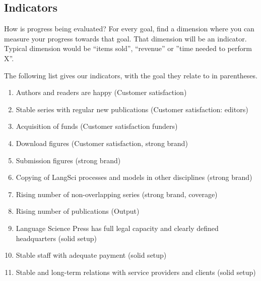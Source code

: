 \documentclass[output=guidelines,nonflat,smallfont,
draftmode
]{langsci/langscibook}
\newcommand{\background}[1]{ 
  \vspace{5mm}
  \renewcommand{\tblslinecolour}{lsDarkBlue}
  \tblssy[red]{explore2}{Background}{\vspace*{-5mm}#1}
}
\newcommand{\langscisolution}[1]{
  \renewcommand{\tblslinecolour}{lsLightBlue}
  \tblssy{langsci}{LangSci solution}{\vspace*{-5mm}#1}
}
\renewcommand{\tblssy}[4][black!12]{%
  \renewcommand{\langscisymbol}{#2}\renewcommand{\tblsboxcolor}{#1}
  \begin{mdframed}[style=yellowexercise,frametitle={#3}]
    #4
  \end{mdframed}
}
\begin{document}
\subsection{Indicators}
\background{How is progress being evaluated? For every goal, find a dimension where you can measure your progress towards that goal. That dimension will be an indicator. Typical dimension would be ``items sold'', ``revenue'' or ''time needed to perform X''.}
\langscisolution{
The following list gives our indicators, with the goal they relate to in parentheses.
\begin{enumerate}
\item Authors and readers are happy (Customer satisfaction) 
\item Stable series with regular new publications (Customer satisfaction: editors)
\item Acquisition of funds  (Customer satisfaction funders)
\item Download figures  (Customer satisfaction, strong brand) 
\item Submission figures (strong brand)
\item Copying of LangSci processes and models in other disciplines (strong brand)
\item Rising number of non-overlapping series (strong brand, coverage)
\item Rising number of publications (Output)
\item Language Science Press has full legal capacity and clearly defined headquarters (solid setup)
\item Stable staff with adequate payment (solid setup)
\item Stable and long-term relations with service providers and clients (solid setup)
\end{enumerate}
 
}
\end{document}
